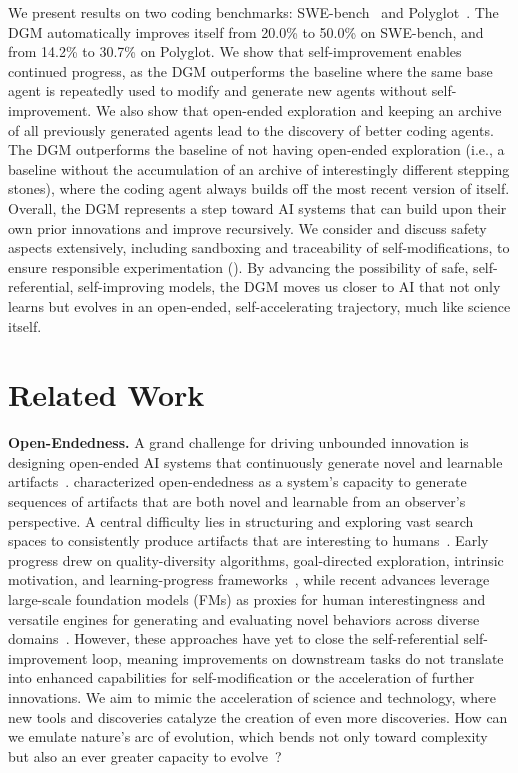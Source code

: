 \documentclass{article}
\begin{document}
We present results on two coding benchmarks: SWE-bench~\citep{jimenez2024swebench} and Polyglot~\citep{gauthier2024polyglot}. The DGM automatically improves itself from 20.0\% to 50.0\% on SWE-bench, and from 14.2\% to 30.7\% on Polyglot. We show that self-improvement enables continued progress, as the DGM outperforms the baseline where the same base agent is repeatedly used to modify and generate new agents without self-improvement. We also show that open-ended exploration and keeping an archive of all previously generated agents lead to the discovery of better coding agents. The DGM outperforms the baseline of not having open-ended exploration (i.e., a baseline without the accumulation of an archive of interestingly different stepping stones), where the coding agent always builds off the most recent version of itself. Overall, the DGM represents a step toward AI systems that can build upon their own prior innovations and improve recursively. We consider and discuss safety aspects extensively, including sandboxing and traceability of self-modifications, to ensure responsible experimentation (). By advancing the possibility of safe, self-referential, self-improving models, the DGM moves us closer to AI that not only learns but evolves in an open-ended, self-accelerating trajectory, much like science itself.


\section{Related Work}
\label{sec:related}


\textbf{Open-Endedness.}
A grand challenge for driving unbounded innovation is designing open-ended AI systems that continuously generate novel and learnable artifacts~\citep{stanley2017open}. \citet{hughes2024open} characterized open-endedness as a system's capacity to generate sequences of artifacts that are both novel and learnable from an observer's perspective. A central difficulty lies in structuring and exploring vast search spaces to consistently produce artifacts that are interesting to humans~\citep{clune2019ai, jiang2023general}. Early progress drew on quality-diversity algorithms, goal-directed exploration, intrinsic motivation, and learning-progress frameworks~\citep{pugh2016quality, ecoffet2019go, lehman2011novelty, oudeyer2007intrinsic}, while recent advances leverage large-scale foundation models (FMs) as proxies for human interestingness and versatile engines for generating and evaluating novel behaviors across diverse domains~\citep{brown2020language, hu2025automated, zhang2024omni}. However, these approaches have yet to close the self-referential self-improvement loop, meaning improvements on downstream tasks do not translate into enhanced capabilities for self-modification or the acceleration of further innovations. We aim to mimic the acceleration of science and technology, where new tools and discoveries catalyze the creation of even more discoveries. How can we emulate nature's arc of evolution, which bends not only toward complexity but also an ever greater capacity to evolve~\citep{dawkins2019evolution, gerhart2007theory, hendrikse2007evolvability}?
\end{document}
